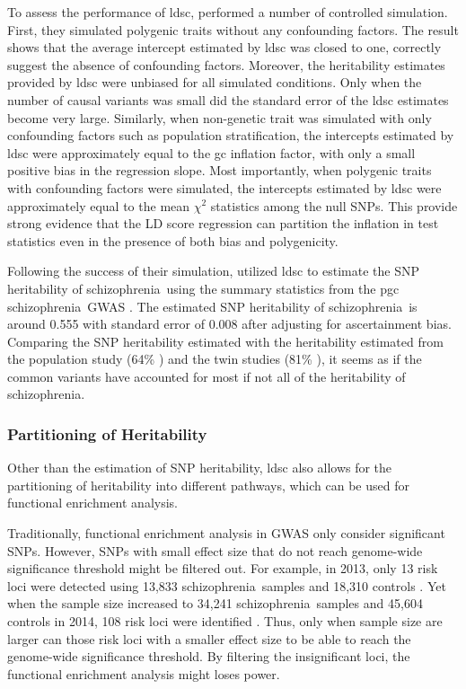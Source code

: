 \documentclass[12pt]{scrbook}
\newcommand*{\scz}{schizophrenia}
\begin{document}
To assess the performance of \gls{ldsc}, \citet{Bulik-Sullivan2015} performed a number of controlled simulation.
First, they simulated polygenic traits without any confounding factors. 
The result shows that the average intercept estimated by \gls{ldsc} was closed to one, correctly suggest the absence of confounding factors.
Moreover, the heritability estimates provided by \gls{ldsc} were unbiased for all simulated conditions. 
Only when the number of causal variants was small did the standard error of the \gls{ldsc} estimates become very large.
Similarly, when non-genetic trait was simulated with only confounding factors such as population stratification, the intercepts estimated by \gls{ldsc} were approximately equal to the \gls{gc} inflation factor, with only a small positive bias in the regression slope.
Most importantly, when polygenic traits with confounding factors were simulated, the intercepts estimated by \gls{ldsc} were approximately equal to the mean $\chi^2$ statistics among the null \glspl{SNP}.
This provide strong evidence that the \gls{LD} score regression can partition the inflation in test statistics even in the presence of both bias and polygenicity.

Following the success of their simulation, \citet{Bulik-Sullivan2015} utilized \gls{ldsc} to estimate the \gls{SNP} heritability of \scz\ using the summary statistics from the \gls{pgc} \scz\ \gls{GWAS} \citep{Ripke2014}.
The estimated \gls{SNP} heritability of \scz\ is around 0.555 with standard error of 0.008 after adjusting for ascertainment bias. 
Comparing the \gls{SNP} heritability estimated with the heritability estimated from the population study (64\% \citep{Lichtenstein2009}) and the twin studies (81\% \citep{sullivan2003schizophrenia}), it seems as if the common variants have accounted for most if not all of the heritability of \scz.

\subsubsection{Partitioning of Heritability}
Other than the estimation of \gls{SNP} heritability, \gls{ldsc} also allows for the partitioning of heritability into different pathways, which can be used for functional enrichment analysis. 

Traditionally, functional enrichment analysis in \gls{GWAS} only consider significant \glspl{SNP}. 
However, \glspl{SNP} with small effect size that do not reach genome-wide significance threshold might be filtered out.
For example, in 2013, only 13 risk loci were detected using 13,833 \scz\ samples and 18,310 controls \citep{Ripke2013}. 
Yet when the sample size increased to 34,241 \scz\ samples and 45,604 controls in 2014, 108 risk loci were identified \citep{Ripke2014}.
Thus, only when sample size are larger can those risk loci with a smaller effect size to be able to reach the genome-wide significance threshold.
By filtering the insignificant loci, the functional enrichment analysis might loses power. 
\end{document}
